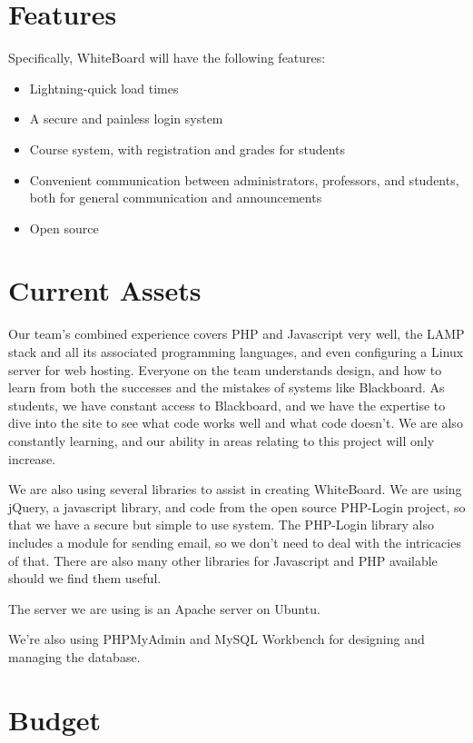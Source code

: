 \documentclass{article}
\begin{document}
\section{Features}

Specifically, WhiteBoard will have the following features:
\begin{itemize}
    \item Lightning-quick load times
    \item A secure and painless login system
    \item Course system, with registration and grades for students
    \item Convenient communication between administrators, professors, and
        students, both for general communication and announcements
    \item Open source
\end{itemize}

\section{Current Assets}

Our team's combined experience covers PHP and Javascript very well, the LAMP
stack and all its associated programming languages, and even configuring a
Linux server for web hosting. Everyone on the team understands design, and how
to learn from both the successes and the mistakes of systems like Blackboard.
As students, we have constant access to Blackboard, and we have the expertise
to dive into the site to see what code works well and what code doesn't. We are
also constantly learning, and our ability in areas relating to this project
will only increase.

We are also using several libraries to assist in creating WhiteBoard. We are
using jQuery, a javascript library, and code from the open source PHP-Login
project, so that we have a secure but simple to use system. The PHP-Login
library also includes a module for sending email, so we don't need to deal with
the intricacies of that. There are also many other libraries for Javascript and
PHP available should we find them useful.

The server we are using is an Apache server on Ubuntu.

We're also using PHPMyAdmin and MySQL Workbench for designing and managing the
database.

\section{Budget}
\end{document}
